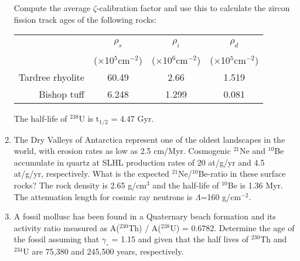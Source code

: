 \begin{enumerate}
Compute the average $\zeta$-calibration factor and use this to
calculate the zircon fission track ages of the following rocks:

\begin{centering}
\begin{tabular}{r@{~}c@{~}c@{~}c}
~ & $\rho_s$ & $\rho_i$ & $\rho_d$ \\
~ & ($\times$10$^5$cm$^{-2}$) & ($\times$10$^6$cm$^{-2}$) & ($\times$10$^5$cm$^{-2}$)\\
\hline
Tardree rhyolite & 60.49 & 2.66 & 1.519 \\
Bishop tuff & 6.248 & 1.299 & 0.081 \\
\end{tabular}
\end{centering}

The half-life of $^{238}$U is t$_{1/2}$ = 4.47 Gyr.\\

\item The Dry Valleys of Antarctica represent one of the oldest
  landscapes in the world, with erosion rates as low as 2.5
  cm/Myr. Cosmogenic $^{21}$Ne and $^{10}$Be accumulate in quartz at
  SLHL production rates of 20 at/g/yr and 4.5 at/g/yr,
  respectively. What is the expected $^{21}$Ne/$^{10}$Be-ratio in
  these surface rocks? The rock density is 2.65 g/cm$^{3}$ and the
  half-life of $^{10}$Be is 1.36 Myr. The attenuation length for
  cosmic ray neutrons is $\Lambda$=160
  g/cm$^{-2}$. 

\item A fossil mollusc has been found in a Quaternary beach formation
  and its activity ratio measured as A($^{230}$Th) / A($^{238}$U) =
  0.6782. Determine the age of the fossil assuming that $\gamma_\circ$
  = 1.15 and given that the half lives of $^{230}$Th and $^{234}$U are
  75,380 and 245,500 years,
  respectively. 

\end{enumerate}
